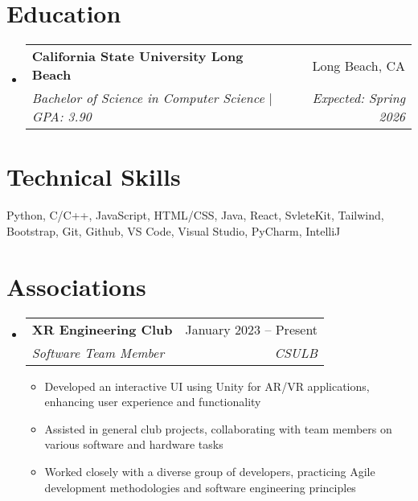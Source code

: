 \documentclass[letterpaper,11pt]{article}
\makeatletter
\newcommand{\resumeItem}[1]{
  \item\small{
    {#1 \vspace{-2pt}}
  }
}
\newcommand{\resumeSubheading}[4]{
  \vspace{-2pt}\item
    \begin{tabular*}{0.97\textwidth}[t]{l@{\extracolsep{\fill}}r}
      \textbf{#1} & #2 \\
      \textit{\small#3} & \textit{\small #4} \\
    \end{tabular*}\vspace{-7pt}
}
\newcommand{\resumeSubHeadingListStart}{\begin{itemize}[leftmargin=0.15in, label={}]}
\newcommand{\resumeSubHeadingListEnd}{\end{itemize}}
\newcommand{\resumeItemListStart}{\begin{itemize}}
\newcommand{\resumeItemListEnd}{\end{itemize}\vspace{-5pt}}
\makeatother
\begin{document}
\section{Education}
  \resumeSubHeadingListStart
    \resumeSubheading
      {California State University Long Beach}{Long Beach, CA}
      {Bachelor of Science in Computer Science $|$ GPA: 3.90}{Expected: Spring 2026}
  \resumeSubHeadingListEnd

%
\section{Technical Skills}
 \begin{itemize}[leftmargin=0.15in, label={}]
    \small{\item{
     { Python, C/C++, JavaScript, HTML/CSS, Java, React, SvleteKit, Tailwind, Bootstrap, Git, Github, VS Code, Visual Studio, PyCharm, IntelliJ} \\  
    }}
 \end{itemize}



\section{Associations}
  \resumeSubHeadingListStart

    \resumeSubheading
      {XR Engineering Club}{January 2023 -- Present}
      {Software Team Member}{CSULB}
      \resumeItemListStart
        \resumeItem{Developed an interactive UI using Unity for AR/VR applications, enhancing user experience and functionality}
        \resumeItem{Assisted in general club projects, collaborating with team members on various software and hardware tasks}
        \resumeItem{Worked closely with a diverse group of developers, practicing Agile development methodologies and software engineering principles}
      \resumeItemListEnd
    \resumeSubHeadingListEnd
\end{document}

